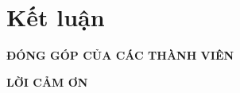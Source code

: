 \documentclass[conference]{IEEEtran}
\begin{document}




















\section{Kết luận}


\begin{center}
\textbf{ĐÓNG GÓP CỦA CÁC THÀNH VIÊN}
\end{center}


\begin{center}
\textbf{LỜI CẢM ƠN}
\end{center}


\printbibliography
\end{document}
